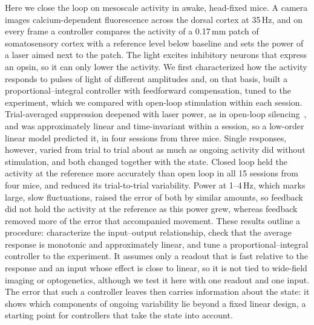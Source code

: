 Here we close the loop on mesoscale activity in awake, head-fixed mice.
A camera images calcium-dependent fluorescence across the dorsal cortex at 35\,Hz, and on every frame a controller compares the activity of a 0.17\,mm patch of somatosensory cortex with a reference level below baseline and sets the power of a laser aimed next to the patch.
The light excites inhibitory neurons that express an opsin, so it can only lower the activity.
We first characterized how the activity responds to pulses of light of different amplitudes and, on that basis, built a proportional--integral controller with feedforward compensation, tuned to the experiment, which we compared with open-loop stimulation within each session.
Trial-averaged suppression deepened with laser power, as in open-loop silencing~\citep{Ambrosone2025}, and was approximately linear and time-invariant within a session, so a low-order linear model predicted it, in four sessions from three mice.
Single responses, however, varied from trial to trial about as much as ongoing activity did without stimulation, and both changed together with the state.
Closed loop held the activity at the reference more accurately than open loop in all 15 sessions from four mice, and reduced its trial-to-trial variability.
Power at 1--4\,Hz, which marks large, slow fluctuations, raised the error of both by similar amounts, so feedback did not hold the activity at the reference as this power grew, whereas feedback removed more of the error that accompanied movement.
These results outline a procedure: characterize the input--output relationship, check that the average response is monotonic and approximately linear, and tune a proportional--integral controller to the experiment.
It assumes only a readout that is fast relative to the response and an input whose effect is close to linear, so it is not tied to wide-field imaging or optogenetics, although we test it here with one readout and one input.
The error that such a controller leaves then carries information about the state: it shows which components of ongoing variability lie beyond a fixed linear design, a starting point for controllers that take the state into account.
